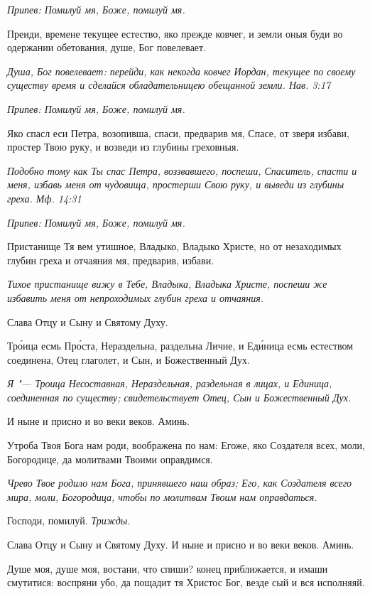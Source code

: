\itshape Припев:\normalfont{} Помилуй мя, Боже, помилуй мя.


Преиди, времене текущее естество, яко прежде ковчег, и земли оныя буди во одержании обетования, душе, Бог повелевает.


\itshape Душа, Бог повелевает: перейди, как некогда ковчег Иордан, текущее по своему существу время и сделайся обладательницею обещанной земли. Нав. 3:17\normalfont{}


\itshape Припев:\normalfont{} Помилуй мя, Боже, помилуй мя.


Яко спасл еси Петра, возопивша, спаси, предварив мя, Спасе, от зверя избави, простер Твою руку, и возведи из глубины греховныя.


\itshape Подобно тому как Ты спас Петра, воззвавшего, поспеши, Спаситель, спасти и меня, избавь меня от чудовища, простерши Свою руку, и выведи из глубины греха. Мф. 14:31\normalfont{}


\itshape Припев:\normalfont{} Помилуй мя, Боже, помилуй мя.


Пристанище Тя вем утишное, Владыко, Владыко Христе, но от незаходимых глубин греха и отчаяния мя, предварив, избави.


\itshape Тихое пристанище вижу в Тебе, Владыка, Владыка Христе, поспеши же избавить меня от непроходимых глубин греха и отчаяния.\normalfont{}


Слава Отцу и Сыну и Святому Духу.


Тро́ица есмь Про́ста, Нераздельна, раздельна Личне, и Еди́ница есмь естеством соединена, Отец глаголет, и Сын, и Божественный Дух.


\itshape Я "--- Троица Несоставная, Нераздельная, раздельная в лицах, и Единица, соединенная по существу; свидетельствует Отец, Сын и Божественный Дух.\normalfont{}


И ныне и присно и во веки веков. Аминь.


Утроба Твоя Бога нам роди, воображена по нам: Егоже, яко Создателя всех, моли, Богородице, да молитвами Твоими оправдимся.


\itshape Чрево Твое родило нам Бога, принявшего наш образ; Его, как Создателя всего мира, моли, Богородица, чтобы по молитвам Твоим нам оправдаться.\normalfont{}


Господи, помилуй. \itshape Трижды.\normalfont{}


Слава Отцу и Сыну и Святому Духу. И ныне и присно и во веки веков. Аминь.


Душе моя, душе моя, востани, что спиши? конец приближается, и имаши смутитися: воспряни убо, да пощадит тя Христос Бог, везде сый и вся исполняяй.



